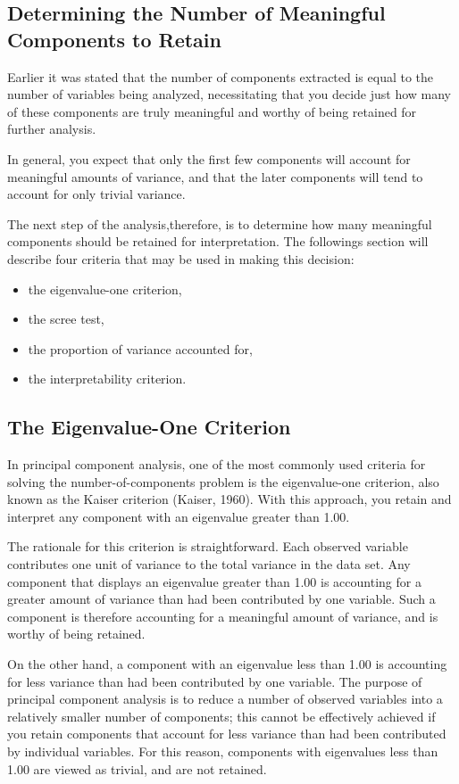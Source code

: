 \documentclass[a4paper,12pt]{article}
\begin{document}
	
	
	\subsection{Determining the Number of Meaningful Components to Retain}
	Earlier it was stated that the number of components extracted is equal to the number of variables
	being analyzed, necessitating that you decide just how many of these components are truly
	meaningful and worthy of being retained for further analysis.
	
	In general, you expect
	that only the first few components will account for meaningful amounts of variance, and that the
	later components will tend to account for only trivial variance.
	
	The next step of the analysis,therefore, is to determine how many meaningful components should be retained for
	interpretation.  The followings section will describe four criteria that may be used in making this decision:
	\begin{itemize} \item the eigenvalue-one criterion, \item the scree test, \item the proportion of variance accounted for, \item the
		interpretability criterion.
	\end{itemize}
	
	
	\subsection{The Eigenvalue-One Criterion}  In principal component analysis, one of the most commonly
	used criteria for solving the number-of-components problem is the eigenvalue-one criterion, also
	known as the Kaiser criterion (Kaiser, 1960).  With this approach, you retain and interpret any
	component with an eigenvalue greater than 1.00.
	
	The rationale for this criterion is straightforward.  Each observed variable contributes one unit of
	variance to the total variance in the data set.  Any component that displays an eigenvalue greater
	than 1.00 is accounting  for a greater amount of variance than had been contributed by one
	variable.  Such a component is therefore accounting for a meaningful amount of variance, and is
	worthy of being retained.
	
	On the other hand, a component with an eigenvalue less than 1.00 is accounting for less variance
	than had been contributed by one variable.  The purpose of principal component analysis is to
	reduce a number of observed variables into a relatively smaller number of components; this
	cannot be effectively achieved if you retain components that account for less variance than had
	been contributed by individual variables.  For this reason, components with eigenvalues less than
	1.00 are viewed as trivial, and are not retained.
	
\end{document}
